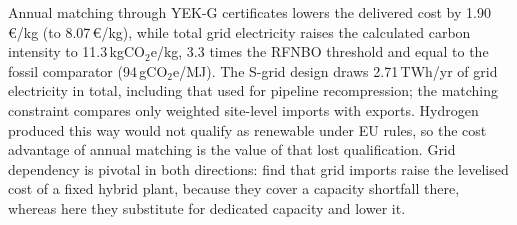 \documentclass[preprint,12pt,authoryear]{elsarticle}
\begin{document}
Annual matching through YEK-G certificates lowers the delivered cost by 1.90\,€/kg (to 8.07\,€/kg), while total grid electricity raises the calculated carbon intensity to 11.3\,kgCO$_2$e/kg, 3.3 times the RFNBO threshold and equal to the fossil comparator (94\,gCO$_2$e/MJ). The S-grid design draws 2.71\,TWh/yr of grid electricity in total, including that used for pipeline recompression; the matching constraint compares only weighted site-level imports with exports. Hydrogen produced this way would not qualify as renewable under EU rules, so the cost advantage of annual matching is the value of that lost qualification. Grid dependency is pivotal in both directions: \citet{devrim2026comprehensive} find that grid imports raise the levelised cost of a fixed hybrid plant, because they cover a capacity shortfall there, whereas here they substitute for dedicated capacity and lower it.
\end{document}

